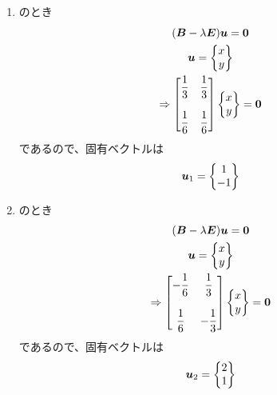 \begin{ans*}
\begin{enumerate}[label=(\arabic*)]
    \begin{enumerate}[label=(\roman*)]
      \item {}のとき
      \begin{gather}
        (\bm{B} -{\lambda}\bm{E}){\bm{u}} = \bm{0} \\
        {\bm{u}} = \begin{Bmatrix} x \\ y \end{Bmatrix} \\
        \Rightarrow
        \begin{bmatrix}
          {\displaystyle\frac{1}{3}} & {\displaystyle\frac{1}{3}} \\&\\ {\displaystyle\frac{1}{6}} & {\displaystyle\frac{1}{6}}
        \end{bmatrix}
        \begin{Bmatrix}
          x \\ y
        \end{Bmatrix}
        =\bm{0}
      \end{gather}
      であるので、固有ベクトルは
      \begin{gather}
        {\bm{u}}_{1} =
        \begin{Bmatrix}
          1 \\ -1
        \end{Bmatrix}
      \end{gather}
      \item {}のとき
      \begin{gather}
        (\bm{B} -{\lambda}\bm{E}){\bm{u}} = \bm{0} \\
        {\bm{u}} = \begin{Bmatrix} x \\ y \end{Bmatrix} \\
        \Rightarrow
        \begin{bmatrix}
          {\displaystyle-\frac{1}{6}} & {\displaystyle\frac{1}{3}} \\&\\ {\displaystyle\frac{1}{6}} & {\displaystyle -\frac{1}{3}}
        \end{bmatrix}
        \begin{Bmatrix}
          x \\ y
        \end{Bmatrix}
        =\bm{0}
      \end{gather}
      であるので、固有ベクトルは
      \begin{gather}
        {\bm{u}}_{2} =
        \begin{Bmatrix}
          2 \\ 1
        \end{Bmatrix}
      \end{gather}
    \end{enumerate}


\end{enumerate}
\end{ans*}
